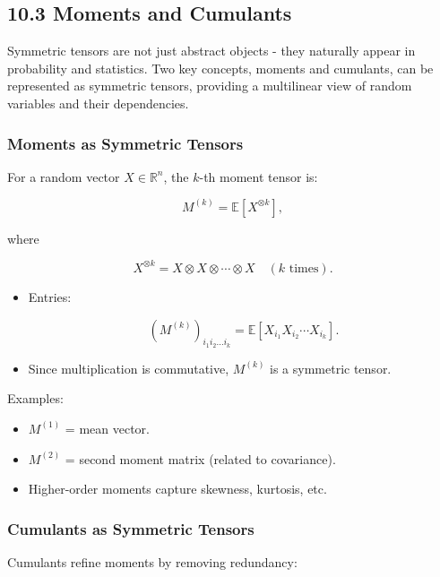 \documentclass[
  letterpaper,
  DIV=11,
  numbers=noendperiod]{scrreprt}
\providecommand{\tightlist}{%
  \setlength{\itemsep}{0pt}\setlength{\parskip}{0pt}}
\begin{document}
\subsection{10.3 Moments and Cumulants}\label{moments-and-cumulants}

Symmetric tensors are not just abstract objects - they naturally appear
in probability and statistics. Two key concepts, moments and cumulants,
can be represented as symmetric tensors, providing a multilinear view of
random variables and their dependencies.

\subsubsection{Moments as Symmetric
Tensors}\label{moments-as-symmetric-tensors}

For a random vector \(X \in \mathbb{R}^n\), the \(k\)-th moment tensor
is:

\[
M^{(k)} = \mathbb{E}[X^{\otimes k}],
\]

where

\[
X^{\otimes k} = X \otimes X \otimes \cdots \otimes X \quad (k \text{ times}).
\]

\begin{itemize}
\item
  Entries:

  \[
  (M^{(k)})_{i_1 i_2 \dots i_k} = \mathbb{E}[X_{i_1} X_{i_2} \cdots X_{i_k}].
  \]
\item
  Since multiplication is commutative, \(M^{(k)}\) is a symmetric
  tensor.
\end{itemize}

Examples:

\begin{itemize}
\tightlist
\item
  \(M^{(1)}\) = mean vector.
\item
  \(M^{(2)}\) = second moment matrix (related to covariance).
\item
  Higher-order moments capture skewness, kurtosis, etc.
\end{itemize}

\subsubsection{Cumulants as Symmetric
Tensors}\label{cumulants-as-symmetric-tensors}

Cumulants refine moments by removing redundancy:
\end{document}
